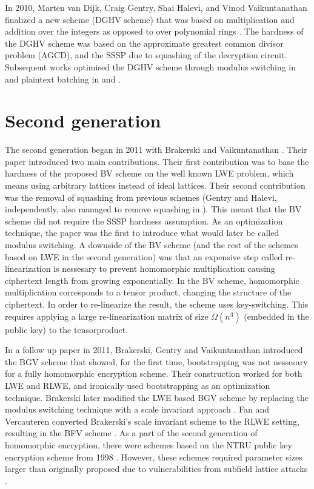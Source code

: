 In 2010, Marten van Dijk, Craig Gentry, Shai Halevi, and Vinod Vaikuntanathan finalized a new scheme (DGHV scheme) that was based on multiplication and addition over the integers as opposed to over polynomial rings \cite{DGHV10}. The hardness of the DGHV scheme was based on the approximate greatest common divisor problem (AGCD), and the SSSP due to squashing of the decryption circuit. Subsequent works optimised the DGHV scheme through modulus switching in \cite{DGHV-modswitch} and plaintext batching in \cite{DGHV-batch1} and \cite{DGHV-batch2}.

\section{Second generation}
The second generation began in 2011 with Brakerski and Vaikuntanathan \cite{BV11}. Their paper introduced two main contributions. Their first contribution was to base the hardness of the proposed BV scheme on the well known LWE problem, which means using arbitrary lattices instead of ideal lattices. Their second contribution was the removal of squashing from previous schemes (Gentry and Halevi, independently, also managed to remove squashing in \cite{Gen-Hal-no-squash}). This meant that the BV scheme did not require the SSSP hardness assumption. As an optimization technique, the paper was the first to introduce what would later be called modulus switching. A downside of the BV scheme (and the rest of the schemes based on LWE in the second generation) was that an expensive step called re-linearization is nessesary to prevent homomorphic multiplication causing ciphertext length from growing exponentially. In the BV scheme, homomorphic multiplication corresponds to a tensor product, changing the structure of the ciphertext. In order to re-linearize the result, the scheme uses key-switching. This requires applying a large re-linearization matrix of size $\Omega(n^3)$ (embedded in the public key) to the tensorproduct.

In a follow up paper in 2011, Brakerski, Gentry and Vaikuntanathan introduced the BGV scheme that showed, for the first time, bootstrapping was not nessesary for a fully homomorphic encryption scheme. Their construction worked for both LWE and RLWE, and ironically used bootstrapping as an optimization technique. Brakerski later modified the LWE based BGV scheme by replacing the modulus switching technique with a scale invariant approach \cite{Bra12-BFV} . Fan and Vercauteren converted Brakerski's scale invariant scheme to the RLWE setting, resulting in the BFV scheme \cite{FV12-BFV}. As a part of the second generation of homomorphic encryption, there were schemes based on the NTRU public key encryption scheme from 1998 \cite{NTRU}. However, these schemes required parameter sizes larger than originally proposed due to vulnerabilities from subfield lattice attacks \cite{NTRU-attack}.

